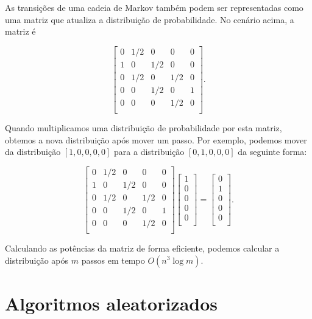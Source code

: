 As transições de uma cadeia de Markov também podem ser
representadas como uma matriz que atualiza a
distribuição de probabilidade.
No cenário acima, a matriz é

\[ 
 \begin{bmatrix}
  0 & 1/2 & 0 & 0 & 0 \\
  1 & 0 & 1/2 & 0 & 0 \\
  0 & 1/2 & 0 & 1/2 & 0 \\
  0 & 0 & 1/2 & 0 & 1 \\
  0 & 0 & 0 & 1/2 & 0 \\
 \end{bmatrix}.
\]

Quando multiplicamos uma distribuição de probabilidade por esta matriz,
obtemos a nova distribuição após mover um passo.
Por exemplo, podemos mover da distribuição
$[1,0,0,0,0]$ para a distribuição
$[0,1,0,0,0]$ da seguinte forma:

\[ 
 \begin{bmatrix}
  0 & 1/2 & 0 & 0 & 0 \\
  1 & 0 & 1/2 & 0 & 0 \\
  0 & 1/2 & 0 & 1/2 & 0 \\
  0 & 0 & 1/2 & 0 & 1 \\
  0 & 0 & 0 & 1/2 & 0 \\
 \end{bmatrix}
 \begin{bmatrix}
  1 \\
  0 \\
  0 \\
  0 \\
  0 \\
 \end{bmatrix}
=
 \begin{bmatrix}
  0 \\
  1 \\
  0 \\
  0 \\
  0 \\
 \end{bmatrix}.
\]

Calculando as potências da matriz de forma eficiente,
podemos calcular a distribuição após $m$ passos
em tempo $O(n^3 \log m)$.

\section{Algoritmos aleatorizados}


